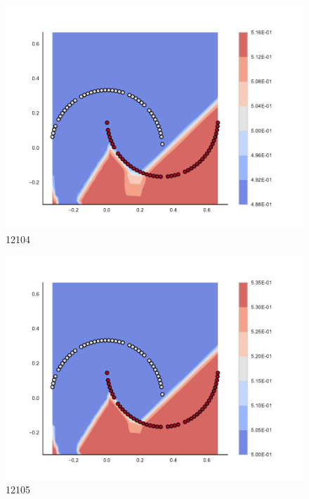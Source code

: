 \begin{subfigure}[b]{0.09\textwidth}
    \includegraphics[clip, trim=2.35cm 1.75cm 4.5cm 0cm,width=\textwidth]{img/convergence/12104.pdf}
    \caption{12104}
    \label{fig:convergence_12104}
\end{subfigure}
%
\begin{subfigure}[b]{0.09\textwidth}
    \includegraphics[clip, trim=2.35cm 1.75cm 4.5cm 0cm,width=\textwidth]{img/convergence/12105.pdf}
    \caption{12105}
    \label{fig:convergence_12105}
\end{subfigure}
%

